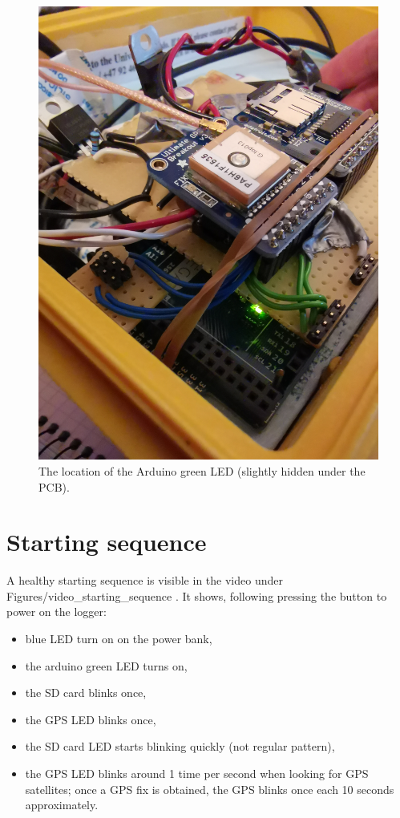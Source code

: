 \documentclass[pdftex,a4paper,12pt,twocolumn,fleqn,captions=tableheading]{scrartcl}
\begin{document}
  \begin{figure}
  \begin{center}
  \includegraphics[width=.8\textwidth]{Figures/Arduino_LED}
  \caption{The location of the Arduino green LED (slightly hidden under the PCB).}
  \end{center}
  \end{figure}

\newpage

\section{Starting sequence}

A healthy starting sequence is visible in the video under Figures/video\_starting\_sequence . It shows, following pressing the button to power on the logger:

\begin{itemize}
  \item blue LED turn on on the power bank,
  \item the arduino green LED turns on,
  \item the SD card blinks once,
  \item the GPS LED blinks once,
  \item the SD card LED starts blinking quickly (not regular pattern),
  \item the GPS LED blinks around 1 time per second when looking for GPS satellites; once a GPS fix is obtained, the GPS blinks once each 10 seconds approximately.
\end{itemize}
\end{document}
